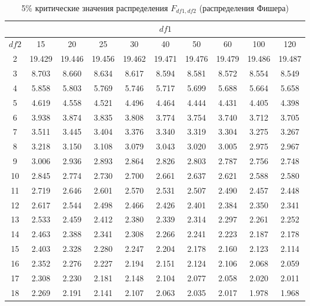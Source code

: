 \documentclass[12pt]{article}
\begin{document}

\begin{table}
\caption{5\% критические значения распределения $F_{df1,df2}$
(распределения Фишера) }
\begin{center}
{\footnotesize
\begin{tabular}{|c|c|c|c|c|c|c|c|c|c|}
  \hline
  & \multicolumn{9}{|c|}{$df1$} \\ \hline
 $df2$ & 15      & 20    &  25     &  30   &  40    &  50    &  60    &  100 & 120\\ \hline \hline
2 & 19.429 &19.446 &19.456 & 19.462 & 19.471 &19.476 &19.479 &19.486 &19.487\\
3 &  8.703 &8.660 &8.634 &  8.617 &  8.594 &8.581 &8.572 &8.554& 8.549\\
4 & 5.858 &5.803 &5.769 &  5.746 &  5.717  & 5.699 &5.688 & 5.664 & 5.658\\
5 & 4.619 &4.558 &4.521 &  4.496 &  4.464 &  4.444 &  4.431 &4.405 &4.398 \\
6 & 3.938 &3.874 &3.835 &3.808  & 3.774  & 3.754 &  3.740 &3.712& 3.705\\
7 & 3.511 &3.445 &3.404 &3.376 &3.340 &  3.319 &  3.304 &3.275& 3.267\\
8 & 3.218& 3.150 &3.108 &3.079 &3.043 &3.020  & 3.005 &2.975 &2.967\\
9 & 3.006 &2.936 &2.893 &2.864 &2.826 &2.803 &2.787 &2.756 &2.748\\
10 & 2.845 &2.774 &2.730 &2.700 &2.661 &2.637 &2.621 &2.588 &2.580\\
11 & 2.719 &2.646 &2.601 &2.570 &2.531 &2.507 &2.490 &2.457 &2.448\\
12 & 2.617 &2.544 &2.498 &2.466 &2.426 &2.401 &2.384 &2.350 &2.341\\
13 & 2.533 &2.459 &2.412 &2.380 &2.339 &2.314 &2.297 &2.261 &2.252\\
14 & 2.463 &2.388 &2.341 &2.308 &2.266 &2.241 &2.223 &2.187 &2.178\\
15 & 2.403 &2.328 &2.280 &2.247 &2.204 &2.178 &2.160 &2.123 &2.114\\
16 & 2.352 &2.276 &2.227 &2.194 &2.151 &2.124 &2.106 &2.068 &2.059\\
17 & 2.308 &2.230 &2.181 &2.148 &2.104 &2.077 &2.058 &2.020 &2.011\\
18 & 2.269 &2.191 &2.141 &2.107 &2.063 &2.035 &2.017 &1.978 &1.968\\

\end{tabular}}
\end{center}
\end{table}
\end{document}
